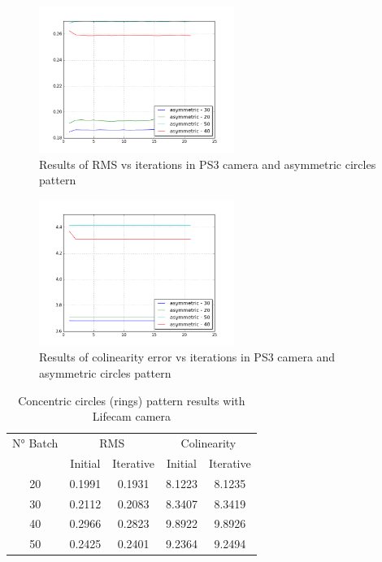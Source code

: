 \documentclass[journal]{IEEEtran}
\begin{document}
\begin{figure}[H]
\centering
\includegraphics[width=2.5in]{_img/report_4/img_results_ps3_asymmetric.png}
\caption{Results of RMS vs iterations in PS3 camera and asymmetric circles pattern}
\end{figure}

\begin{figure}[H]
\centering
\includegraphics[width=2.5in]{_img/report_4/img_results_ps3_colinearity_asymmetric.png}
\caption{Results of colinearity error vs iterations in PS3 camera and asymmetric circles pattern}
\end{figure}

\begin{table}[h]
\centering
\caption{Concentric circles (rings) pattern results with Lifecam camera}
\begin{tabular}{ |c||c|c|c|c|  }
 \hline
 N° Batch & \multicolumn{2}{c|}{RMS} & \multicolumn{2}{c|}{Colinearity}\\
 \cline{2-5}
 & Initial & Iterative & Initial & Iterative \\
 \hline
 20        & 0.1991 & 0.1931 & 8.1223 & 8.1235 \\
 30        & 0.2112 & 0.2083 & 8.3407 & 8.3419 \\
 40        & 0.2966 & 0.2823 & 9.8922 & 9.8926 \\
 50        & 0.2425 & 0.2401 & 9.2364 & 9.2494 \\
 \hline
\end{tabular}
\\
\end{table}
\end{document}
